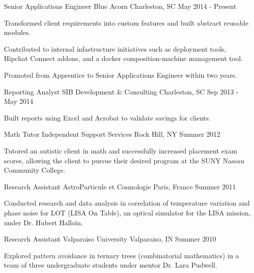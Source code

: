 \begin{cventries}
  \cventry
    {Senior Applications Engineer}
    {Blue Acorn}
    {Charleston, SC}
    {May 2014 - Present}
    {
      \begin{cvitems}
        \item {Transformed client requirements into custom features and built abstract reusable modules.}
        \item {Contributed to internal infastructure initiatives such as deployment tools, Hipchat Connect addons, and a docker composition-machine management tool.}
        \item {Promoted from Apprentice to Senior Applications Engineer within two years.}
      \end{cvitems}
    }
  \cventry
    {Reporting Analyst}
    {SIB Development \& Consulting}
    {Charleston, SC}
    {Sep 2013 - May 2014}
    {
      \begin{cvitems}
        \item {Built reports using Excel and Acrobat to validate savings for clients.}
      \end{cvitems}
    }
  \cventry
    {Math Tutor}
    {Independent Support Services}
    {Rock Hill, NY}
    {Summer 2012}
    {
      \begin{cvitems}
        \item {Tutored an autistic client in math and successfully increased placement exam scores, allowing the client to pursue their desired program at the SUNY Nassau Community College.}
      \end{cvitems}
    }
  \cventry
    {Research Assistant}
    {AstroParticule et Cosmologie}
    {Paris, France}
    {Summer 2011}
    {
      \begin{cvitems}
        \item {Conducted research and data analysis in correlation of temperature variation and phase noise for LOT (LISA On Table), an optical simulator for the LISA mission, under Dr. Hubert Halloin.}
      \end{cvitems}
    }
  \cventry
    {Research Assistant}
    {Valparaiso University}
    {Valparaiso, IN}
    {Summer 2010}
    {
      \begin{cvitems}
        \item {Explored pattern avoidance in ternary trees (combinatorial mathematics) in a team of three undergraduate students under mentor Dr. Lara Pudwell.}
      \end{cvitems}
    }
\end{cventries}

